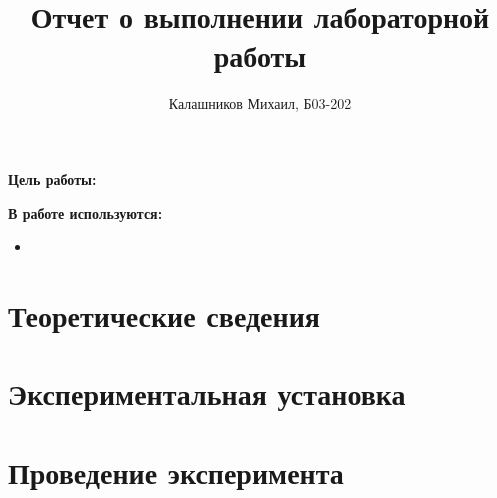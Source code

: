 \documentclass[14pt, a4paper]{report}
\title{\textbf{Отчет о выполнении лабораторной работы}}
\author{Калашников Михаил, Б03-202}
\date{}
\begin{document}
\maketitle

\textbf{Цель работы:}

\textbf{В работе используются:}
\begin{itemize}
\item
\end{itemize}

\section{Теоретические сведения}

\section{Экспериментальная установка}

\section{Проведение эксперимента}
\end{document}
